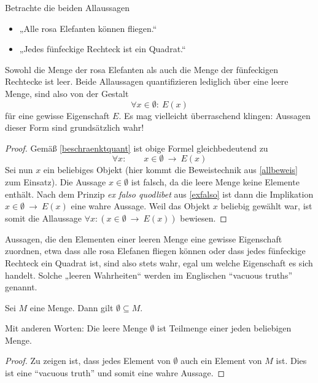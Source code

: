 \begin{bem} \label{vacuoustruth} 
    Betrachte die beiden Allaussagen
    \begin{itemize}
        \item „Alle rosa Elefanten können fliegen.“
        \item „Jedes fünfeckige Rechteck ist ein Quadrat.“
    \end{itemize}	
    Sowohl die Menge der rosa Elefanten als auch die Menge der fünfeckigen Rechtecke ist leer. Beide Allaussagen quantifizieren lediglich über eine leere Menge, sind also von der Gestalt
        \[ \forall x\in \emptyset:\ E(x) \]
    für eine gewisse Eigenschaft $E$. Es mag vielleicht überraschend klingen: Aussagen dieser Form sind grundsätzlich wahr!
    \begin{proof}
        Gemäß \cref{beschraenktquant} ist obige Formel gleichbedeutend zu
            \[ \forall x:\qquad x\in \emptyset\ \to\ E(x) \]
        Sei nun $x$ ein beliebiges Objekt (hier kommt die Beweistechnik aus \cref{allbeweis} zum Einsatz). Die Aussage $x\in\emptyset$ ist falsch, da die leere Menge keine Elemente enthält. Nach dem Prinzip \emph{ex falso quodlibet} aus \cref{exfalso} ist dann die Implikation $x\in \emptyset\ \to\ E(x)$ eine wahre Aussage. Weil das Objekt $x$ beliebig gewählt war, ist somit die Allaussage $\forall x: \left(x\in \emptyset\ \to\ E(x)\right)$ bewiesen.
	\end{proof}
    \noindent Aussagen, die den Elementen einer leeren Menge eine gewisse Eigenschaft zuordnen, etwa dass alle rosa Elefanen fliegen können oder dass jedes fünfeckige Rechteck ein Quadrat ist, sind also stets wahr, egal um welche Eigenschaft es sich handelt. Solche „leeren Wahrheiten“ werden im Englischen ``vacuous truths'' genannt.
\end{bem}


\begin{satz} \label{leeremengeimmerdrin}
    Sei $M$ eine Menge. Dann gilt $\emptyset\subseteq M$.

    Mit anderen Worten: Die leere Menge $\emptyset$ ist Teilmenge einer jeden beliebigen Menge.
\end{satz}
\begin{proof}
    Zu zeigen ist, dass jedes Element von $\emptyset$ auch ein Element von $M$ ist. Dies ist eine ``vacuous truth'' und somit eine wahre Aussage.
\end{proof}





